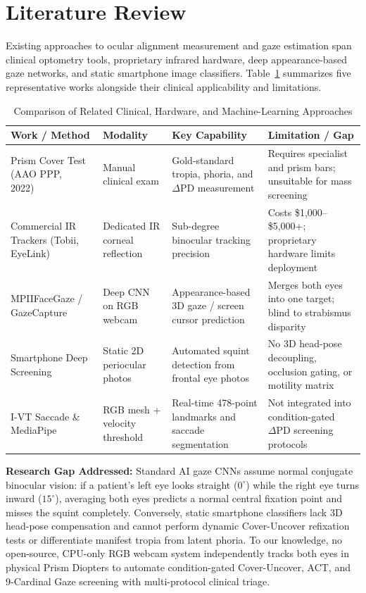 \documentclass[11pt,a4paper]{article}
\begin{document}
\section{Literature Review}
Existing approaches to ocular alignment measurement and gaze estimation span clinical optometry tools, proprietary infrared hardware, deep appearance-based gaze networks, and static smartphone image classifiers. Table~\ref{tab:lit_review} summarizes five representative works alongside their clinical applicability and limitations.

\begin{table}[H]
\centering
\caption{Comparison of Related Clinical, Hardware, and Machine-Learning Approaches}
\label{tab:lit_review}
\footnotesize
\setlength{\tabcolsep}{4pt}
\begin{tabularx}{\textwidth}{@{}p{3.1cm}p{2.5cm}p{4.3cm}X@{}}
\toprule
\textbf{Work / Method} & \textbf{Modality} & \textbf{Key Capability} & \textbf{Limitation / Gap} \\
\midrule
Prism Cover Test (AAO PPP, 2022)~\cite{ref1} & Manual clinical exam & Gold-standard tropia, phoria, and $\Delta\text{PD}$ measurement & Requires specialist and prism bars; unsuitable for mass screening \\
Commercial IR Trackers (Tobii, EyeLink)~\cite{ref6} & Dedicated IR corneal reflection & Sub-degree binocular tracking precision & Costs \$1,000--\$5,000+; proprietary hardware limits deployment \\
MPIIFaceGaze / GazeCapture~\cite{ref4,ref7} & Deep CNN on RGB webcam & Appearance-based 3D gaze / screen cursor prediction & Merges both eyes into one target; blind to strabismus disparity \\
Smartphone Deep Screening~\cite{ref2,ref8} & Static 2D periocular photos & Automated squint detection from frontal eye photos & No 3D head-pose decoupling, occlusion gating, or motility matrix \\
I-VT Saccade \& MediaPipe~\cite{ref3,ref5} & RGB mesh + velocity threshold & Real-time 478-point landmarks and saccade segmentation & Not integrated into condition-gated $\Delta\text{PD}$ screening protocols \\
\bottomrule
\end{tabularx}
\end{table}

\textbf{Research Gap Addressed:} Standard AI gaze CNNs assume normal conjugate binocular vision: if a patient's left eye looks straight ($0^\circ$) while the right eye turns inward ($15^\circ$), averaging both eyes predicts a normal central fixation point and misses the squint completely. Conversely, static smartphone classifiers lack 3D head-pose compensation and cannot perform dynamic Cover-Uncover refixation tests or differentiate manifest tropia from latent phoria. To our knowledge, no open-source, CPU-only RGB webcam system independently tracks both eyes in physical Prism Diopters to automate condition-gated Cover-Uncover, ACT, and 9-Cardinal Gaze screening with multi-protocol clinical triage.
\end{document}
